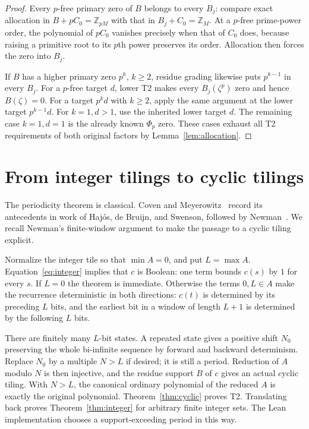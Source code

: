 \documentclass[11pt]{article}
\newcommand{\Z}{\mathbb Z}
\newcommand{\PhiC}{\Phi}
\begin{document}
\begin{proof}
Every $p$-free primary zero of $B$ belongs to every $B_j$: compare exact allocation in $B+pC_0=\Z_{pM}$ with that in $B_j+C_0=\Z_M$. At a $p$-free prime-power order, the polynomial of $pC_0$ vanishes precisely when that of $C_0$ does, because raising a primitive root to its $p$th power preserves its order. Allocation then forces the zero into $B_j$.

If $B$ has a higher primary zero $p^k$, $k\ge2$, residue grading likewise puts $p^{k-1}$ in every $B_j$. For a $p$-free target $d$, lower T2 makes every $B_j(\zeta^p)$ zero and hence $B(\zeta)=0$. For a target $p^kd$ with $k\ge2$, apply the same argument at the lower target $p^{k-1}d$. For $k=1,d>1$, use the inherited lower target $d$. The remaining case $k=1,d=1$ is the already known $\PhiC_p$ zero. These cases exhaust all T2 requirements of both original factors by Lemma~\ref{lem:allocation}.
\end{proof}

\section{From integer tilings to cyclic tilings}
The periodicity theorem is classical. Coven and Meyerowitz~\cite[Lemma~1.2]{CM} record its antecedents in work of Haj\'os, de Bruijn, and Swenson, followed by Newman~\cite{Newman}. We recall Newman's finite-window argument to make the passage to a cyclic tiling explicit.

Normalize the integer tile so that $\min A=0$, and put $L=\max A$. Equation~\eqref{eq:integer} implies that $c$ is Boolean: one term bounds $c(s)$ by $1$ for every $s$. If $L=0$ the theorem is immediate. Otherwise the terms $0,L\in A$ make the recurrence deterministic in both directions: $c(t)$ is determined by its preceding $L$ bits, and the earliest bit in a window of length $L+1$ is determined by the following $L$ bits.

There are finitely many $L$-bit states. A repeated state gives a positive shift $N_0$ preserving the whole bi-infinite sequence by forward and backward determinism. Replace $N_0$ by a multiple $N>L$ if desired; it is still a period. Reduction of $A$ modulo $N$ is then injective, and the residue support $B$ of $c$ gives an actual cyclic tiling. With $N>L$, the canonical ordinary polynomial of the reduced $A$ is exactly the original polynomial. Theorem~\ref{thm:cyclic} proves T2. Translating back proves Theorem~\ref{thm:integer} for arbitrary finite integer sets. The Lean implementation chooses a support-exceeding period in this way.
\end{document}
